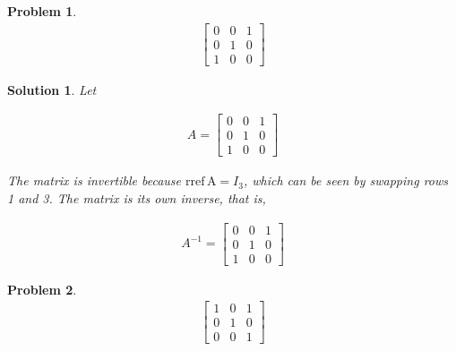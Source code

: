 \documentclass{article}
\newtheorem{problem}{Problem}
\newtheorem*{solution}{Solution}
\newcommand{\rref}[1]{\mathrm{rref \, #1}}
\begin{document}
\begin{problem}
\begin{align*}
\begin{bmatrix}
0 & 0 & 1 \\
0 & 1 & 0 \\
1 & 0 & 0
\end{bmatrix}
\end{align*}
\end{problem}

\begin{solution}
Let 

\begin{align*}
A = \begin{bmatrix}
0 & 0 & 1 \\
0 & 1 & 0 \\
1 & 0 & 0
\end{bmatrix}
\end{align*}

The matrix is invertible because $\rref{A} = I_{3}$, which can be seen by swapping rows 1 and 3. The matrix is its own inverse, that is,

\begin{align*}
A^{-1} = \begin{bmatrix}
0 & 0 & 1 \\
0 & 1 & 0 \\
1 & 0 & 0
\end{bmatrix}
\end{align*}

\end{solution}

\begin{problem}
\begin{align*}
\begin{bmatrix}
1 & 0 & 1 \\
0 & 1 & 0 \\
0 & 0 & 1
\end{bmatrix}
\end{align*}
\end{problem}
\end{document}
